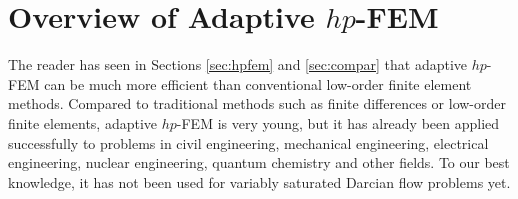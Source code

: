\documentclass[final,3p,times,twocolumn]{elsarticle}
\newcommand{\bfx}{\mbox{\boldmath $x$}}
\newcommand{\bfS}{\mbox{\boldmath $S$}}
\begin{document}
% 
% 
% 
% 
% 






\section{Overview of Adaptive $hp$-FEM}
\label{sec:methods}



The reader has seen in Sections \ref{sec:hpfem} and \ref{sec:compar}
that adaptive $hp$-FEM can be much more efficient than 
conventional low-order finite element methods. Compared to 
traditional methods such as finite differences or low-order finite 
elements, adaptive $hp$-FEM is very young, but 
it has already been applied successfully to problems in civil
engineering, mechanical engineering, electrical engineering, 
nuclear engineering, quantum chemistry and other fields. To our best 
knowledge, it has not been used for variably saturated Darcian 
flow problems yet.
\end{document}
